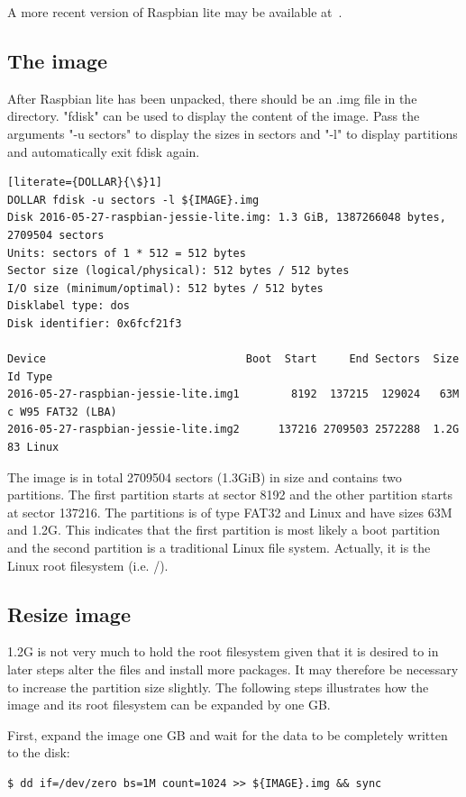 A more recent version of Raspbian lite may be available at~\cite{raspbian}.

\subsection{The image}

After Raspbian lite has been unpacked, there should be an .img file in the directory.
"fdisk" can be used to display the content of the image. Pass the arguments "-u sectors" to
display the sizes in sectors and "-l" to display partitions and automatically
exit fdisk again.

\begin{lstlisting}[literate={DOLLAR}{\$}1]
DOLLAR fdisk -u sectors -l ${IMAGE}.img
Disk 2016-05-27-raspbian-jessie-lite.img: 1.3 GiB, 1387266048 bytes, 2709504 sectors
Units: sectors of 1 * 512 = 512 bytes
Sector size (logical/physical): 512 bytes / 512 bytes
I/O size (minimum/optimal): 512 bytes / 512 bytes
Disklabel type: dos
Disk identifier: 0x6fcf21f3

Device                               Boot  Start     End Sectors  Size Id Type
2016-05-27-raspbian-jessie-lite.img1        8192  137215  129024   63M  c W95 FAT32 (LBA)
2016-05-27-raspbian-jessie-lite.img2      137216 2709503 2572288  1.2G 83 Linux
\end{lstlisting}
\FloatBarrier

The image is in total 2709504 sectors (1.3GiB) in size and contains two
partitions. The first partition starts at sector 8192 and
the other partition starts at sector 137216. The partitions is of type FAT32
and Linux and have sizes 63M and 1.2G. This indicates that the first partition
is most likely a boot partition and the second partition is a traditional Linux file
system. Actually, it is the Linux root filesystem (i.e. /).

\subsection{Resize image}
1.2G is not very much to hold the root filesystem given that it is desired to
in later steps alter the files and install more packages. It may therefore be
necessary to increase the partition size slightly.
The following steps illustrates how the image and its root filesystem
can be expanded by one \ac{GB}.

First, expand the image one \ac{GB} and wait for the data to be completely written
to the disk:
\begin{lstlisting}[]
$ dd if=/dev/zero bs=1M count=1024 >> ${IMAGE}.img && sync
\end{lstlisting}
\FloatBarrier
\vspace{-5mm}

